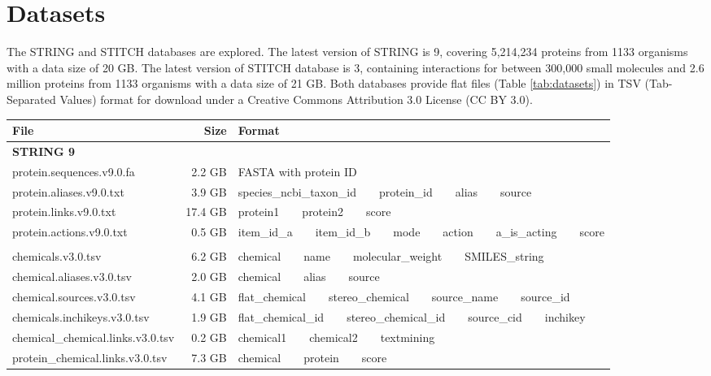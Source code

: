 \documentclass[10pt,conference,compsocconf]{../IEEEtran}
\begin{document}
\section{Datasets}

The STRING and STITCH databases are explored. The latest version of STRING is 9, covering 5,214,234 proteins from 1133 organisms with a data size of 20 GB. The latest version of STITCH database is 3, containing interactions for between 300,000 small molecules and 2.6 million proteins from 1133 organisms with a data size of 21 GB. Both databases provide flat files (Table \ref{tab:datasets}) in TSV (Tab-Separated Values) format for download under a Creative Commons Attribution 3.0 License (CC BY 3.0).

\begin{table*}
\centering
\begin{tabular*}
{\linewidth}
{@{\extracolsep{\fill}}lrl}
\toprule
File & Size & Format\\
\midrule
\multicolumn{3}{l}{\textbf{STRING 9}}\\
protein.sequences.v9.0.fa &  2.2 GB & FASTA with protein ID\\
protein.aliases.v9.0.txt  &  3.9 GB & species\_ncbi\_taxon\_id\ \ \ \ protein\_id\ \ \ \ alias\ \ \ \ source\\
protein.links.v9.0.txt    & 17.4 GB & protein1\ \ \ \ protein2\ \ \ \ score\\
protein.actions.v9.0.txt  &  0.5 GB & item\_id\_a\ \ \ \ item\_id\_b\ \ \ \ mode\ \ \ \ action\ \ \ \ a\_is\_acting\ \ \ \ score\\
\noalign{\smallskip\smallskip}
\multicolumn{3}{l}{\textbf{STITCH 3}}\\
chemicals.v3.0.tsv                & 6.2 GB & chemical\ \ \ \ name\ \ \ \ molecular\_weight\ \ \ \ SMILES\_string\\
chemical.aliases.v3.0.tsv         & 2.0 GB & chemical\ \ \ \ alias\ \ \ \ source\\
chemical.sources.v3.0.tsv         & 4.1 GB & flat\_chemical\ \ \ \ stereo\_chemical\ \ \ \ source\_name\ \ \ \ source\_id\\
chemicals.inchikeys.v3.0.tsv      & 1.9 GB & flat\_chemical\_id\ \ \ \ stereo\_chemical\_id\ \ \ \ source\_cid\ \ \ \ inchikey\\
chemical\_chemical.links.v3.0.tsv & 0.2 GB & chemical1\ \ \ \ chemical2\ \ \ \ textmining\\
protein\_chemical.links.v3.0.tsv  & 7.3 GB & chemical\ \ \ \ protein\ \ \ \ score\\
\bottomrule
\end{tabular*}
\caption{Flat files provided by STRING 9 and STITCH 3.}
\label{tab:datasets}
\end{table*}
\end{document}
